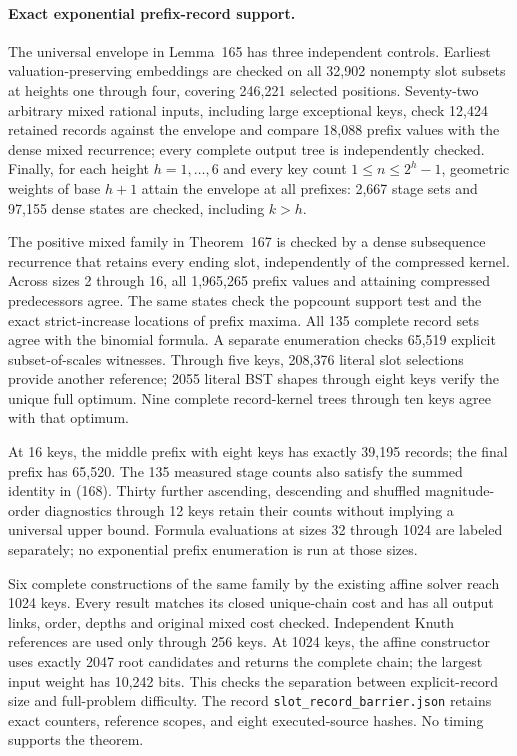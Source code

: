 \documentclass[11pt]{article}
\begin{document}
\paragraph{Exact exponential prefix-record support.}
The universal envelope in Lemma~165 has
three independent controls. Earliest valuation-preserving embeddings are
checked on all 32,902 nonempty slot subsets at heights one through four,
covering 246,221 selected positions. Seventy-two arbitrary mixed rational
inputs, including large exceptional keys, check 12,424 retained records
against the envelope and compare 18,088 prefix values with the dense mixed
recurrence; every complete output tree is independently checked. Finally,
for each height $h=1,\ldots,6$ and every key count $1\le n\le2^h-1$,
geometric weights of base $h+1$ attain the envelope at all prefixes:
2,667 stage sets and 97,155 dense states are checked, including $k>h$.

The positive mixed family in Theorem~167 is checked
by a dense subsequence recurrence that retains every ending slot, independently
of the compressed kernel. Across sizes 2 through 16, all 1,965,265 prefix
values and attaining compressed predecessors agree. The same states check
the popcount support test and the exact strict-increase locations of prefix
maxima. All 135 complete record sets agree with the binomial formula.
A separate enumeration checks 65,519 explicit subset-of-scales witnesses.
Through five keys, 208,376 literal slot selections provide another reference;
2055 literal BST shapes through eight keys verify the unique full optimum.
Nine complete record-kernel trees through ten keys agree with that optimum.

At 16 keys, the middle prefix with eight keys has exactly 39,195 records;
the final prefix has 65,520. The 135 measured stage counts also satisfy
the summed identity in (168). Thirty further
ascending, descending and shuffled magnitude-order diagnostics through 12
keys retain their counts without implying a universal upper bound.
Formula evaluations at sizes 32 through 1024 are labeled separately;
no exponential prefix enumeration is run at those sizes.

Six complete constructions of the same family by the existing affine solver
reach 1024 keys. Every result matches its closed unique-chain cost and has
all output links, order, depths and original mixed cost checked. Independent
Knuth references are used only through 256 keys. At 1024 keys, the affine
constructor uses exactly 2047 root candidates and returns the complete
chain; the largest input weight has 10,242 bits. This checks the separation
between explicit-record size and full-problem difficulty. The record
\texttt{slot\_record\_barrier.json} retains exact counters, reference scopes,
and eight executed-source hashes. No timing supports the theorem.
\end{document}
